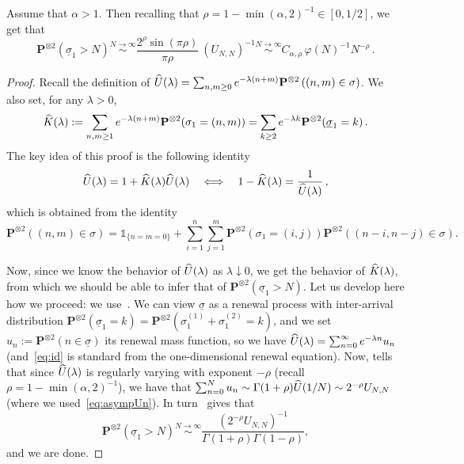 \documentclass[AHL,Unicode,longabstracts]{cedram}
\newcommand{\ga}{\alpha}
\newcommand{\gl}{\lambda}
\newcommand{\unbf}%
{\mathds{1}}
\let\oldhat\hat
\renewcommand*{\hat}[1]{\mathchoice{\widehat{#1}}{\widehat{#1}}{\oldhat{#1}}{\oldhat{#1}}}
\newcommand{\bP}{\ensuremath{\mathbf{P}}}
\begin{document}
\begin{appendix}
\begin{lemm}\label{lem:tau1}
Assume that $\ga>1$. Then recalling that $\rho=1-\min(\ga,2)^{-1} \in[0,1/2]$, we get that
\begin{equation}
\bP^{\otimes 2} \left(\underline{\sigma}_1 > N \right) \stackrel{N \to \infty}\sim \frac{2^{\rho} \sin(\pi \rho)}{ \pi \rho} \ (U_{N,N})^{-1} \stackrel{N \to \infty}\sim C_{\ga,\rho}\,\varphi(N)^{-1} N^{-\rho}\,.
\end{equation}
\end{lemm}

\begin{proof}
Recall the definition of $\hat U (\gl) = \sum_{n,m \ge 0} e^{- \lambda (n+m)} \bP^{\otimes 2} \left((n,m) \in \sigma \right) $. We also set, for any $\gl>0$,
\begin{equation}
\hat{K}(\lambda) := \sum_{n,m \ge 1} e^{- \lambda (n+m)} \bP^{\otimes 2} (\sigma_1 = (n,m)) = \sum_{k \ge 2} e^{- \lambda k} \bP^{\otimes 2} (\underline{\sigma}_1 = k)\,.
\end{equation}
The key idea of this proof is the following identity
\begin{equation}\label{eq:id}
\hat U(\gl) = 1+ \hat K(\gl) \hat U(\gl) \quad\Longleftrightarrow \quad 1- \hat{K}(\lambda) = \frac{1}{\hat{U}(\lambda)}\,,
\end{equation}
which is obtained from the identity
\begin{equation}
\bP^{\otimes 2} \left((n,m) \in \sigma \right) = \unbf_{\{n=m=0\}} + \sum_{i=1}^{n}\sum_{j=1}^{m} \bP^{\otimes 2} (\sigma_1 = (i,j)) \bP^{\otimes 2} ((n-i,n-j) \in\sigma).\!
\end{equation}

Now, since we know the behavior of $\hat U(\gl)$ as $\gl\downarrow0$, we get the behavior of $\hat K(\gl)$, from which we should be able to infer that of $\bP^{\otimes 2}(\underline \sigma_1 >N)$. Let us develop here how we proceed: we use~\cite[Corollary~1.7.3 and Theorem~8.7.3]{cf:BGT}. We can view $\underline\sigma$ as a renewal process with inter-arrival distribution $\bP^{\otimes 2} (\underline \sigma_1=k) = \bP^{\otimes 2} (\sigma_1^{(1)} + \sigma_1^{(2)}=k)$, and we set $u_n:= \bP^{\otimes 2} (n \in \underline \sigma)$ its renewal mass function, so we have $\hat U(\gl) = \sum_{n=0}^{\infty} e^{-\gl n} u_n$ (and~\eqref{eq:id} is standard from the one-dimensional renewal equation). Now, \cite[Corollary~1.7.3]{cf:BGT} tells that since $\hat U(\gl)$ is regularly varying with exponent $-\rho$ (recall $\rho = 1-\min(\ga,2)^{-1}$), we have that $\sum_{n=0}^N u_n \sim \Gamma(1+\rho) \hat U(1/N) \sim 2^{-\rho} U_{N,N}$ (where we used~\eqref{eq:asympUn}). In turn~\cite[Theorem~8.7.3]{cf:BGT} gives that
\[
\bP^{\otimes 2} (\underline\sigma _1 >N) \stackrel{N\to\infty}{\sim} \frac{(2^{-\rho} U_{N,N})^{-1}}{\Gamma(1+\rho) \Gamma(1-\rho)},
\]
and we are done.
\end{proof}


\end{appendix}
\end{document}
